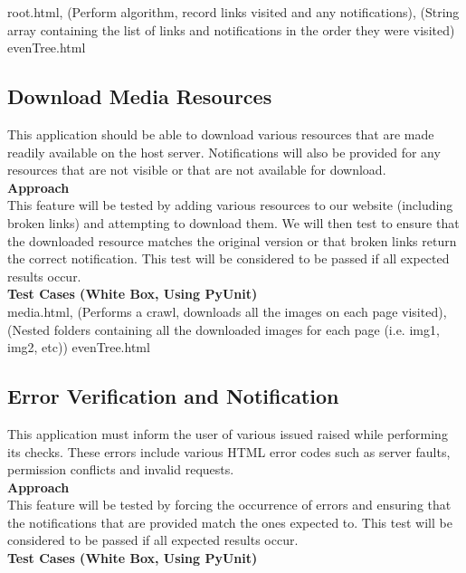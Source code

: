 \documentclass[12pt, titlepage]{article}
\begin{document}
root.html, (Perform algorithm, record links visited and any notifications), (String array containing the list of links and notifications in the order they were visited)
evenTree.html

\subsection{Download Media Resources}
This application should be able to download various resources that are made readily available on the host server. Notifications will also be provided for any resources that are not visible or that are not available for download.\\

\textbf{Approach}\\

This feature will be tested by adding various resources to our website (including broken links) and attempting to download them. We will then test to ensure that the downloaded resource matches the original version or that broken links return the correct notification. This test will be considered to be passed if all expected results occur.\\

\textbf{Test Cases (White Box, Using PyUnit)}\\

media.html, (Performs a crawl, downloads all the images on each page visited), (Nested folders containing all the downloaded images for each page (i.e. img1, img2, etc))
evenTree.html

\subsection{Error Verification and Notification}
This application must inform the user of various issued raised while performing its checks. These errors include various HTML error codes such as server faults, permission conflicts and invalid requests.\\

\textbf{Approach}\\

This feature will be tested by forcing the occurrence of errors and ensuring that the notifications that are provided match the ones expected to. This test will be considered to be passed if all expected results occur.\\

\textbf{Test Cases (White Box, Using PyUnit)}\\
\end{document}
